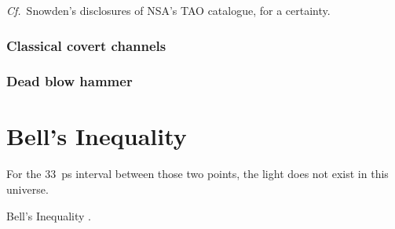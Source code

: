 \documentclass[a4paper,twoside,11pt]{book}
\begin{document}
\emph{Cf.}\ Snowden's disclosures of NSA's TAO catalogue, for a certainty.
\subsubsection{Classical covert channels}
\subsubsection{Dead blow hammer}

\section{Bell's Inequality}
For the \SI{33}{\pico\second} interval between those two points, the light does
not exist in this universe.

Bell's Inequality \cite{Bell1964}.

\end{document}
